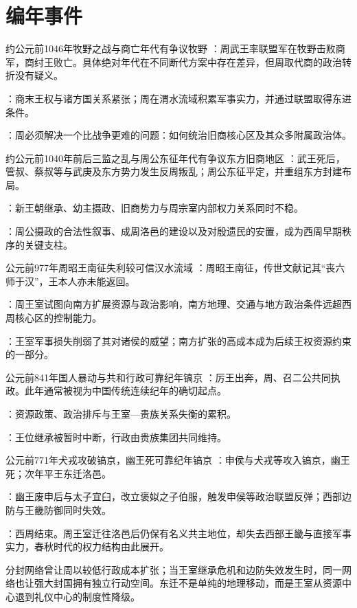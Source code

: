 \section{编年事件}

\begin{event}{约公元前1046年}{牧野之战与商亡}{年代有争议}{牧野}
：周武王率联盟军在牧野击败商军，商纣王败亡。具体绝对年代在不同断代方案中存在差异，但周取代商的政治转折没有疑义。

：商末王权与诸方国关系紧张；周在渭水流域积累军事实力，并通过联盟取得东进条件。

：周必须解决一个比战争更难的问题：如何统治旧商核心区及其众多附属政治体。
\end{event}

\begin{event}{约公元前1040年前后}{三监之乱与周公东征}{年代有争议}{东方旧商地区}
：武王死后，管叔、蔡叔等与武庚及东方势力发生反周叛乱；周公东征平定，并重组东方封建布局。

：新王朝继承、幼主摄政、旧商势力与周宗室内部权力关系同时不稳。

：周公摄政的合法性叙事、成周洛邑的建设以及对殷遗民的安置，成为西周早期秩序的关键支柱。
\end{event}

\begin{event}{公元前977年}{周昭王南征失利}{较可信}{汉水流域}
：周昭王南征，传世文献记其“丧六师于汉”，王本人亦未能返回。

：周王室试图向南方扩展资源与政治影响，南方地理、交通与地方政治条件远超西周核心区的控制能力。

：王室军事损失削弱了其对诸侯的威望；南方扩张的高成本成为后续王权资源约束的一部分。
\end{event}

\begin{event}{公元前841年}{国人暴动与共和行政}{可靠纪年}{镐京}
：厉王出奔，周、召二公共同执政。此年通常被视为中国传统连续纪年的确切起点。

：资源政策、政治排斥与王室—贵族关系失衡的累积。

：王位继承被暂时中断，行政由贵族集团共同维持。
\end{event}

\begin{event}{公元前771年}{犬戎攻破镐京，幽王死}{可靠纪年}{镐京}
：申侯与犬戎等攻入镐京，幽王死；次年平王东迁洛邑。

：幽王废申后与太子宜臼，改立褒姒之子伯服，触发申侯等政治联盟反弹；西部边防与王畿防御同时失效。

：西周结束。周王室迁往洛邑后仍保有名义共主地位，却失去西部王畿与直接军事实力，春秋时代的权力结构由此展开。
\end{event}

\begin{causalchain}[西周至东周]
分封网络曾让周以较低行政成本扩张；当王室继承危机和边防失效发生时，同一网络也让强大封国拥有独立行动空间。东迁不是单纯的地理移动，而是王室从资源中心退到礼仪中心的制度性降级。
\end{causalchain}
